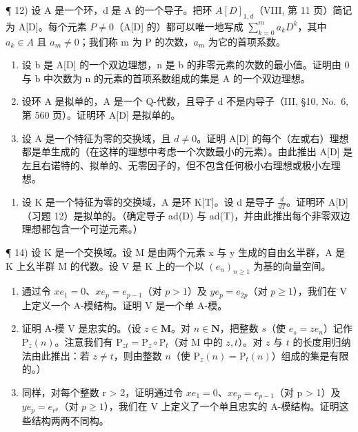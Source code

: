 ¶ 12) 设 A 是一个环，d 是 A 的一个导子。把环 \(A[D]_{1,d}\)（VIII, 第 11 页）简记为 A{[}D{]}。每个元素 \(P \neq 0\)（A{[}D{]} 的）都可以唯一地写成 \(\sum_{k=0}^{m} a_k D^k\)，其中 \(a_k \in A\) 且 \(a_m \neq 0\)；我们称 m 为 P 的次数，\(a_m\) 为它的首项系数。

\begin{enumerate}
\def\labelenumi{\alph{enumi})}
\item
  设 b 是 A{[}D{]} 的一个双边理想，n 是 b 的非零元素的次数的最小值。证明由 0 与 b 中次数为 n 的元素的首项系数组成的集是 A 的一个双边理想。
\item
  设环 A 是拟单的，A 是一个 Q-代数，且导子 d 不是内导子（III, §10, No.~6, 第 560 页）。证明环 A{[}D{]} 是拟单的。
\item
  设 A 是一个特征为零的交换域，且 \(d \neq 0\)。证明 A{[}D{]} 的每个（左或右）理想都是单生成的（在这样的理想中考虑一个次数最小的元素）。由此推出 A{[}D{]} 是左且右诺特的、拟单的、无零因子的，但不包含任何极小右理想或极小左理想。
\end{enumerate}

\begin{enumerate}
\def\labelenumi{\arabic{enumi})}
\setcounter{enumi}{12}
\tightlist
\item
  设 K 是一个特征为零的交换域，A 是环 K{[}T{]}。设 d 是导子 \(\frac{d}{dT}\)。证明环 A{[}D{]}（习题 12）是拟单的。（确定导子 ad(D) 与 ad(T)，并由此推出每个非零双边理想都包含一个可逆元素。）
\end{enumerate}

¶ 14) 设 K 是一个交换域。设 M 是由两个元素 x 与 y 生成的自由幺半群，A 是 K 上幺半群 M 的代数。设 V 是 K 上的一个以 \((e_{n})_{n\geqslant1}\) 为基的向量空间。

\begin{enumerate}
\def\labelenumi{\alph{enumi})}
\item
  通过令 \(xe_1 = 0\)、\(xe_p = e_{p-1}\)（对 \(p > 1\)）及 \(ye_p = e_{2p}\)（对 \(p \geqslant 1\)），我们在 V 上定义一个 A-模结构。证明 V 是一个单 A-模。
\item
  证明 A-模 V 是忠实的。（设 \(z \in \mathbf{M}\)。对 \(n \in \mathbf{N}\)，把整数 \(s\)（使 \(e_s = ze_n\)）记作 \(\mathrm{P}_z(n)\)。注意我们有 \(\mathrm{P}_{zt} = \mathrm{P}_z \circ \mathrm{P}_t\)（对 M 中的 \(z, t\)）。对 \(z\) 与 \(t\) 的长度用归纳法由此推出：若 \(z \neq t\)，则由整数 \(n\)（使 \(\mathrm{P}_z(n) = \mathrm{P}_t(n)\)）组成的集是有限的。）
\item
  同样，对每个整数 r \textgreater{} 2，证明通过令 \(xe_{1} = 0\)、\(xe_{p} = e_{p-1}\)（对 p \textgreater{} 1）及 \(ye_{p} = e_{r^{p}}\)（对 \(p \geqslant 1\)），我们在 V 上定义了一个单且忠实的 A-模结构。证明这些结构两两不同构。
\end{enumerate}

